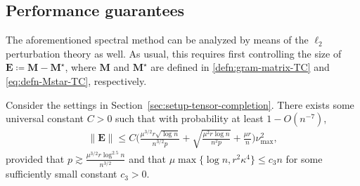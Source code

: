 \subsection{Performance guarantees}
\label{sec:theory-TC}


The aforementioned spectral method can be analyzed by means of the $\ell_{2}$ perturbation theory as well.
As usual, this requires first
controlling the size of $\bm{E} \coloneqq \bm{M}-\bm{M}^{\star}$, where $\bm{M}$ and $\bm{M}^{\star}$ are defined in \eqref{defn:gram-matrix-TC} and \eqref{eq:defn-Mstar-TC}, respectively.
%
\begin{lemma}
	\label{lem:size-E-TC}
	Consider the settings in Section~\ref{sec:setup-tensor-completion}. There exists some universal constant $C>0$ such that with probability at least $1-O(n^{-7})$,
	\begin{align}
		\|\bm{E}\| \leq C  \Bigg( \frac{\mu^{3/2}r\sqrt{\log n}}{n^{3/2}p} + \sqrt{\frac{\mu^{2}r\log n}{n^{2}p}}  + \frac{\mu r}{n} \Bigg)\nu_{\max}^{2},
	\end{align}
	provided that $p\gtrsim \frac{\mu^{3/2}r\log^{2.5}n}{n^{3/2}}$ and that $\mu \max\{\log n, r^2\kappa^4 \} \leq c_3 n$ for some sufficiently small constant $c_3>0$.
\end{lemma}
%


